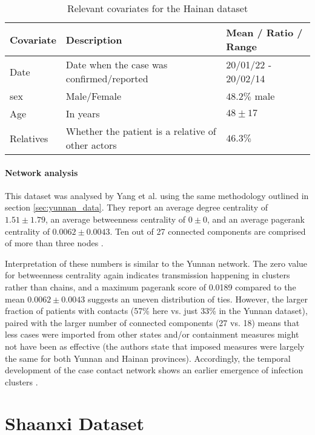 \begin{table}
	\begin{mdframed}
		\begin{tabularx}{\linewidth}{XXX}
		\hline
		\textbf{Covariate} & \textbf{Description} & \textbf{Mean / Ratio / Range}\\
		\hline
		\hline
		Date & Date when the case was confirmed/reported & 20/01/22 - 20/02/14\\
		\hline
		sex & Male/Female & $48.2\%$ male\\
		\hline
		Age & In years & $48\pm17$ \\
		\hline
		Relatives & Whether the patient is a relative of other actors & $46.3\%$ \\
		\hline
		\hline
	\end{tabularx}
	\caption{Relevant covariates for the Hainan dataset}
	\label{tab:hainan_covariates}
	\end{mdframed}
\end{table}

\paragraph{Network analysis} This dataset was analysed by Yang et al. using the same methodology outlined in section \ref{sec:yunnan_data}. They report an average degree centrality of $1.51\pm1.79$, an average betweenness centrality of $0\pm0$, and an average pagerank centrality of $0.0062\pm0.0043$. Ten out of 27 connected components are comprised of more than three nodes \cite{hainan_publication}. 

Interpretation of these numbers is similar to the Yunnan network. The zero value for betweenness centrality again indicates transmission happening in clusters rather than chains, and a maximum pagerank score of 0.0189 compared to the mean $0.0062\pm0.0043$ suggests an uneven distribution of ties. However, the larger fraction of patients with contacts (57\% here vs. just 33\% in the Yunnan dataset), paired with the larger number of connected components (27 vs. 18) means that less cases were imported from other states and/or containment measures might not have been as effective (the authors state that imposed measures were largely the same for both Yunnan and Hainan provinces). Accordingly, the temporal development of the case contact network shows an earlier emergence of infection clusters \cite{hainan_publication}.

\section{Shaanxi Dataset}
\label{sec:shaanxi_data}

